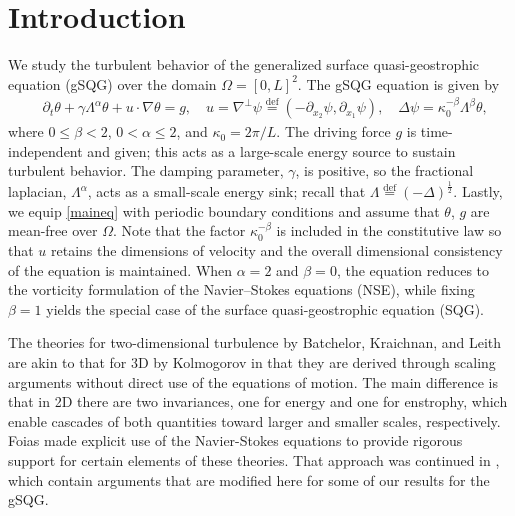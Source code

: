 \documentclass[twoside, reqno]{amsart}
\numberwithin{lemma}{section}
\numberwithin{theorem}{section}
\numberwithin{proposition}{section}
\numberwithin{equation}{section} %
\newcommand{\ptl}{\partial}
\newcommand{\te}{\theta}
\newcommand{\ga}{\gamma}
\newcommand{\la}{\Lambda}
\newcommand{\ka}{\kappa}
\newcommand{\al}{\alpha}
\newcommand{\gam}{\gamma}
\newcommand{\Om}{\Omega}
\newcommand{\tht}{\theta}
\newcommand{\bdy}{\partial}
\begin{document}
\section{Introduction}
 We study the turbulent behavior of the generalized surface quasi-geostrophic equation (gSQG) over the domain $\Omega=[0,L]^2$. The gSQG equation is given by
\begin{align} \label{maineq}
    &\ptl_t \te + \ga \la ^{\alpha} \te + u \cdot \nabla \te = g,\quad u=\nabla^{\perp}\psi \overset{\text{def}}{=}(-\bdy_{x_2} \psi, \bdy_{x_1} \psi),\quad
    \Delta \psi = \ka_0^{-\beta}\la^{\beta} \te,
\end{align}
where $0\leq \beta < 2$, $0<\alpha \leq 2$, and $\ka_0=2\pi/L$. {The driving force $g$ is time-independent and given; this acts as a large-scale energy source to sustain turbulent behavior. The damping parameter, $\gam$, is positive, so the fractional laplacian, $\la^\al$, acts as a small-scale energy sink; recall that $\la\overset{\text{def}}{=}(-\Delta)^{\frac{1}{2}}$. Lastly, we equip \eqref{maineq} with periodic boundary conditions and assume that $\tht$, $g$ are mean-free over $\Om$.  Note that the factor $\ka_0^{-\beta}$ is included in the constitutive law so that $u$ retains the dimensions of velocity and the overall dimensional consistency of the equation is maintained.}   When $ \alpha = 2 $ and $ \beta = 0 $, the equation reduces to the vorticity formulation of the Navier--Stokes equations (NSE), while fixing $ \beta = 1 $ yields the special case of the surface quasi-geostrophic equation (SQG).


The theories for two-dimensional turbulence by Batchelor, Kraichnan, and Leith
\cite{B53, Kraichnan1967, Leith} are akin to that for 3D by Kolmogorov \cite{KO1991} in that they
are derived through scaling arguments without direct use of the equations of motion.  The main difference is that in 2D there are two invariances, one for energy and one for enstrophy, which enable cascades of both quantities toward larger and smaller scales, respectively.  Foias \cite{foias1997turbulence} made explicit use of the Navier-Stokes equations to provide rigorous support for certain elements of these theories.  That approach was continued in \cite{FJMR2002,Dascaliuc2008}, which contain arguments that are modified here for  %
some of our results for
the gSQG.
\end{document}

